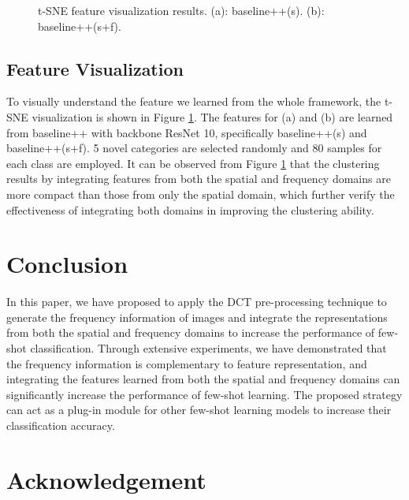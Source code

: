 \documentclass[10pt, conference, compsocconf]{IEEEtran}
\begin{document}
\begin{figure}[tb]
\begin{center}
\qquad
{}\end{center}
\caption{t-SNE feature visualization results. (a): baseline++(s).  (b): baseline++(s+f).}
\label{fig4}
\end{figure}

\subsection{Feature Visualization}

To visually understand the feature we learned from the whole framework, the t-SNE visualization \cite{maaten2008visualizing} is shown in Figure \ref{fig4}. The features for (a) and (b) are learned from baseline++ with backbone ResNet 10, specifically baseline++(s) and baseline++(s+f). 5 novel categories are selected randomly and 80 samples for each class are employed. It can be observed from Figure \ref{fig4} that the clustering results by integrating features from both the spatial and frequency domains are more compact than those from only the spatial domain, which further verify the effectiveness of integrating both domains in improving the clustering ability. 

\section{Conclusion}

In this paper, we have proposed to apply the DCT pre-processing technique to generate the frequency information of images and integrate the representations from both the spatial and frequency domains to increase the performance of few-shot classification. Through extensive experiments, we have demonstrated that the frequency information is complementary to feature representation, and integrating the features learned from both the spatial and frequency domains can significantly increase the performance of few-shot learning. The proposed strategy can act as a plug-in module for other few-shot learning models to increase their classification accuracy.




\section*{Acknowledgement}
\end{document}

